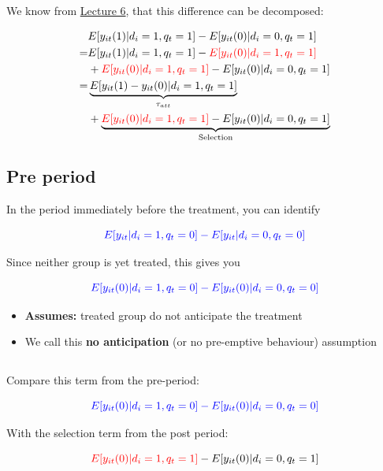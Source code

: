 \documentclass[
  letterpaper,
  DIV=11,
  numbers=noendperiod]{scrartcl}
\begin{document}
We know from \href{lecture-6-multi.qmd}{Lecture 6}, that this difference
can be decomposed:

\[
  \begin{aligned}
  &E[y_{it}(1) | d_i =1, q_t = 1]-E[y_{it}(0) | d_i =0, q_t = 1] \\
  =& E[y_{it}(1) | d_i =1, q_t = 1]-\textcolor{red}{E[y_{it}(0) | d_i =1, q_t = 1]} \\
  &+\textcolor{red}{E[y_{it}(0) | d_i =1, q_t = 1]} -E[y_{it}(0) | d_i =0, q_t = 1] \\
  =& \underbrace{E[y_{it}(1)-y_{it}(0) | d_i =1, q_t = 1]}_{\tau_{att}} \\
  &+\underbrace{\textcolor{red}{E[y_{it}(0) | d_i =1, q_t = 1]} -E[y_{it}(0) | d_i =0, q_t = 1]}_\text{Selection}
  \end{aligned}
\]

\subsection{Pre period}\label{pre-period}

In the period immediately before the treatment, you can identify

\[
  \textcolor{blue}{E[y_{it} | d_i =1, q_t = 0]-E[y_{it} | d_i =0, q_t = 0]}
\]

Since neither group is yet treated, this gives you

\[
  \textcolor{blue}{E[y_{it}(0) | d_i =1, q_t = 0]-E[y_{it}(0) | d_i =0, q_t = 0]}
\]

\begin{itemize}
\item
  \textbf{Assumes:} treated group do not anticipate the treatment
\item
  We call this \textbf{no anticipation} (or no pre-emptive behaviour)
  assumption
\end{itemize}

\subsection{}\label{section-3}

Compare this term from the pre-period:

\[
  \textcolor{blue}{E[y_{it}(0) | d_i =1, q_t = 0]-E[y_{it}(0) | d_i =0, q_t = 0]}
\]

\hfill\break

With the selection term from the post period:

\[
  \textcolor{red}{E[y_{it}(0) | d_i =1, q_t = 1]} -E[y_{it}(0) | d_i =0, q_t = 1]
\]
\end{document}
